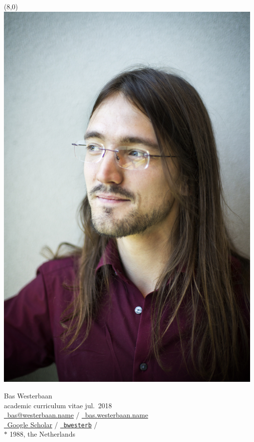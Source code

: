 \documentclass{article}
\newcommand\hsep{ {\color{gray}/} }
\begin{document}
\begin{textblock}{2}(8,0)
\includegraphics[width=\textwidth]{me}
\end{textblock}\noindent
\textsf{\Large Bas Westerbaan}\\
academic curriculum vitae jul.~2018\\

\noindent
\href{mailto:bas@westerbaan.name}{\faEnvelopeO\ bas@westerbaan.name} \hsep
\href{https://bas.westerbaan.name}{\faExternalLink\ bas.westerbaan.name}\\
\href{https://scholar.google.nl/citations?user=AN7BEa8AAAAJ}{%
    \faGraduationCap\ Google Scholar}
    \hsep \href{https://github.com/bwesterb}{\faGithub\ \texttt{bwesterb}}
    \hsep \href{https://www.linkedin.com/in/baswesterbaan/}{\faLinkedinSquare} \\
$*$ 1988, the Netherlands
\end{document}
